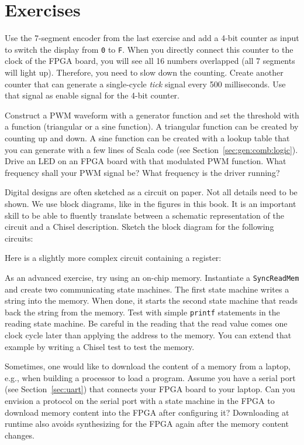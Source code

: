\documentclass[%
    10pt,
    headinclude, footexclude,
    openright, %
    notitlepage,
    cleardoubleempty,
    headsepline,
    pointlessnumbers,
    bibtotoc, idxtotoc,
    ]{scrbook}
\newcommand{\code}[1]{{\lstinline[basicstyle=\small\ttfamily]{#1}}}
\begin{document}
\section{Exercises}

Use the 7-segment encoder from the last exercise and add a 4-bit counter as input
to switch the display from \code{0} to \code{F}. When you directly connect this
counter to the clock of the FPGA board, you will see all 16 numbers
overlapped (all 7 segments will light up).
Therefore, you need to slow down the counting. Create another
counter that can generate a single-cycle \emph{tick} signal every 500 milliseconds.
Use that signal as enable signal for the 4-bit counter.

Construct a PWM waveform with a generator function and set the threshold with a
function (triangular or a sine function).
A triangular function can be created by counting up and down. A sine function can be created with
a lookup table that you can generate with a few lines of Scala code
(see Section~\ref{sec:gen:comb:logic}).
Drive an LED on an FPGA board with that modulated PWM function. What frequency shall your
PWM signal be? What frequency is the driver running?

Digital designs are often sketched as a circuit on paper. Not all details need to be shown.
We use block diagrams, like in the figures in this book. It is an important skill to be able
to fluently translate between a schematic representation of the circuit and a Chisel description.
Sketch the block diagram for the following circuits:


\noindent Here is a slightly more complex circuit containing a register:


As an advanced exercise, try using an on-chip memory. Instantiate a \code{SyncReadMem}
and create two communicating state machines. The first state machine writes a string
into the memory. When done, it starts the second state machine that reads back
the string from the memory. Test with simple \code{printf} statements in the
reading state machine. Be careful in the reading that the read value comes one clock cycle
later than applying the address to the memory.
You can extend that example by writing a Chisel test to test the memory.

Sometimes, one would like to download the content of a memory from a laptop,
e.g., when building a processor to load a program. Assume you have a
serial port (see Section~\ref{sec:uart}) that connects your FPGA
board to your laptop. Can you envision a protocol on the serial port
with a state machine in the FPGA to download memory content into
the FPGA after configuring it? Downloading at runtime also avoids synthesizing
for the FPGA again after the memory content changes.
\end{document}
